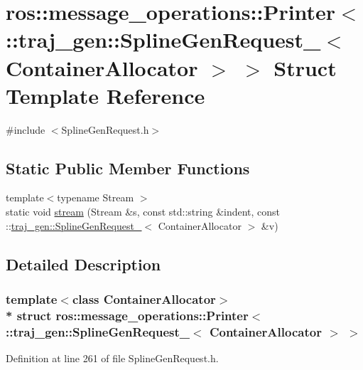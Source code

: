 \hypertarget{structros_1_1message__operations_1_1_printer_3_01_1_1traj__gen_1_1_spline_gen_request___3_01_container_allocator_01_4_01_4}{}\section{ros\+:\+:message\+\_\+operations\+:\+:Printer$<$ \+:\+:traj\+\_\+gen\+:\+:Spline\+Gen\+Request\+\_\+$<$ Container\+Allocator $>$ $>$ Struct Template Reference}
\label{structros_1_1message__operations_1_1_printer_3_01_1_1traj__gen_1_1_spline_gen_request___3_01_container_allocator_01_4_01_4}


{\ttfamily \#include $<$Spline\+Gen\+Request.\+h$>$}

\subsection*{Static Public Member Functions}
\begin{DoxyCompactItemize}
\item 
{\footnotesize template$<$typename Stream $>$ }\\static void \hyperlink{structros_1_1message__operations_1_1_printer_3_01_1_1traj__gen_1_1_spline_gen_request___3_01_container_allocator_01_4_01_4_ad03f9f28d214181f295d68c8c5e468db}{stream} (Stream \&s, const std\+::string \&indent, const \+::\hyperlink{structtraj__gen_1_1_spline_gen_request__}{traj\+\_\+gen\+::\+Spline\+Gen\+Request\+\_\+}$<$ Container\+Allocator $>$ \&v)
\end{DoxyCompactItemize}


\subsection{Detailed Description}
\subsubsection*{template$<$class Container\+Allocator$>$\\*
struct ros\+::message\+\_\+operations\+::\+Printer$<$ \+::traj\+\_\+gen\+::\+Spline\+Gen\+Request\+\_\+$<$ Container\+Allocator $>$ $>$}



Definition at line 261 of file Spline\+Gen\+Request.\+h.



